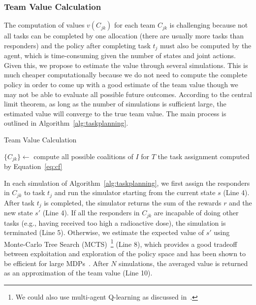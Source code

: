 \subsubsection{Team Value Calculation}
\noindent The computation of values  $v(C_{jk})$ for each team
$C_{jk}$ is challenging because not all tasks can be completed by
one allocation (there are usually more tasks than responders) and
the policy after completing task $t_j$ must also be computed by the
agent, which is time-consuming given the number of states and joint
actions. Given this, we propose to estimate the value through
several simulations. This is much cheaper computationally because
we do not need to compute the complete policy in order to come up
with a good estimate of the team value though we may not be able to
evaluate all possible future outcomes. According to the central
limit theorem, as long as the number of simulations is sufficient
large, the estimated value will converge to the true team value.
The main process is outlined in Algorithm~\ref{alg:taskplanning}.
\begin{algorithm}[htbp]\small
  \caption{Team Value Calculation}
  \label{alg:taskplanning}
  \Indm
  \Indp\BlankLine
  $\{ C_{jk} \} \gets$ compute all possible coalitions of $I$ for
  $T$ \;
  \Return the task assignment computed by Equation~\ref{eq:cf}
\end{algorithm}

In each simulation of Algorithm~\ref{alg:taskplanning}, we first
assign the responders in $C_{jk}$ to task $t_j$ and run the
simulator starting from the current state $s$ (Line 4). After task
$t_j$ is completed, the simulator returns the sum of the rewards
$r$ and the new state $s'$ (Line 4). If all the responders in
$C_{jk}$ are incapable of doing other tasks (e.g., having received
too high a radioactive dose), the simulation is terminated (Line
5). Otherwise, we estimate the expected value of $s'$ using
Monte-Carlo Tree Search (MCTS)~\footnote{We could also use
multi-agent Q-learning as discussed in~\cite{proper2009solving}.}
(Line 8), which provides a good tradeoff between exploitation and
exploration of the policy space and has been shown to be efficient
for large MDPs~\cite{kocsis2006bandit}. After $N$ simulations, the
averaged value is returned as an approximation of the team value
(Line 10).

